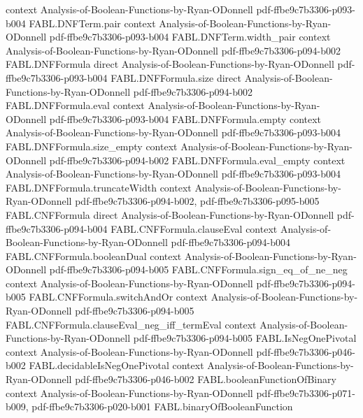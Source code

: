 \begin{theorem}
  {context}
  {Analysis-of-Boolean-Functions-by-Ryan-ODonnell}
  {pdf-ffbe9c7b3306-p093-b004}
\proofstep
  {FABL.DNFTerm.pair}
  {context}
  {Analysis-of-Boolean-Functions-by-Ryan-ODonnell}
  {pdf-ffbe9c7b3306-p093-b004}
\proofstep
  {FABL.DNFTerm.width_pair}
  {context}
  {Analysis-of-Boolean-Functions-by-Ryan-ODonnell}
  {pdf-ffbe9c7b3306-p094-b002}
\proofstep
  {FABL.DNFFormula}
  {direct}
  {Analysis-of-Boolean-Functions-by-Ryan-ODonnell}
  {pdf-ffbe9c7b3306-p093-b004}
\proofstep
  {FABL.DNFFormula.size}
  {direct}
  {Analysis-of-Boolean-Functions-by-Ryan-ODonnell}
  {pdf-ffbe9c7b3306-p094-b002}
\proofstep
  {FABL.DNFFormula.eval}
  {context}
  {Analysis-of-Boolean-Functions-by-Ryan-ODonnell}
  {pdf-ffbe9c7b3306-p093-b004}
\proofstep
  {FABL.DNFFormula.empty}
  {context}
  {Analysis-of-Boolean-Functions-by-Ryan-ODonnell}
  {pdf-ffbe9c7b3306-p093-b004}
\proofstep
  {FABL.DNFFormula.size_empty}
  {context}
  {Analysis-of-Boolean-Functions-by-Ryan-ODonnell}
  {pdf-ffbe9c7b3306-p094-b002}
\proofstep
  {FABL.DNFFormula.eval_empty}
  {context}
  {Analysis-of-Boolean-Functions-by-Ryan-ODonnell}
  {pdf-ffbe9c7b3306-p093-b004}
\proofstep
  {FABL.DNFFormula.truncateWidth}
  {context}
  {Analysis-of-Boolean-Functions-by-Ryan-ODonnell}
  {pdf-ffbe9c7b3306-p094-b002,
    pdf-ffbe9c7b3306-p095-b005}
\proofstep
  {FABL.CNFFormula}
  {direct}
  {Analysis-of-Boolean-Functions-by-Ryan-ODonnell}
  {pdf-ffbe9c7b3306-p094-b004}
\proofstep
  {FABL.CNFFormula.clauseEval}
  {context}
  {Analysis-of-Boolean-Functions-by-Ryan-ODonnell}
  {pdf-ffbe9c7b3306-p094-b004}
\proofstep
  {FABL.CNFFormula.booleanDual}
  {context}
  {Analysis-of-Boolean-Functions-by-Ryan-ODonnell}
  {pdf-ffbe9c7b3306-p094-b005}
\proofstep
  {FABL.CNFFormula.sign_eq_of_ne_neg}
  {context}
  {Analysis-of-Boolean-Functions-by-Ryan-ODonnell}
  {pdf-ffbe9c7b3306-p094-b005}
\proofstep
  {FABL.CNFFormula.switchAndOr}
  {context}
  {Analysis-of-Boolean-Functions-by-Ryan-ODonnell}
  {pdf-ffbe9c7b3306-p094-b005}
\proofstep
  {FABL.CNFFormula.clauseEval_neg_iff_termEval}
  {context}
  {Analysis-of-Boolean-Functions-by-Ryan-ODonnell}
  {pdf-ffbe9c7b3306-p094-b005}
\proofstep
  {FABL.IsNegOnePivotal}
  {context}
  {Analysis-of-Boolean-Functions-by-Ryan-ODonnell}
  {pdf-ffbe9c7b3306-p046-b002}
\proofstep
  {FABL.decidableIsNegOnePivotal}
  {context}
  {Analysis-of-Boolean-Functions-by-Ryan-ODonnell}
  {pdf-ffbe9c7b3306-p046-b002}
\proofstep
  {FABL.booleanFunctionOfBinary}
  {context}
  {Analysis-of-Boolean-Functions-by-Ryan-ODonnell}
  {pdf-ffbe9c7b3306-p071-b009,
    pdf-ffbe9c7b3306-p020-b001}
\proofstep
  {FABL.binaryOfBooleanFunction}

\end{theorem}
